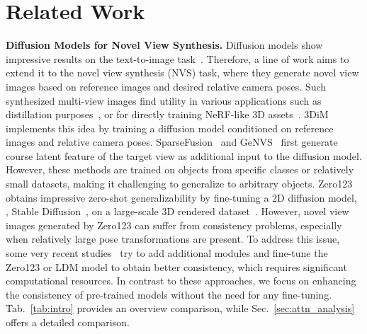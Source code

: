 \section{Related Work}
\label{sec:related_work}

\textbf{Diffusion Models for Novel View Synthesis.}
Diffusion models show impressive results on the text-to-image task~\cite{stable-diffusion, imagen, dalle2}. 
Therefore, a line of work aims to extend it to the novel view synthesis (NVS) task, where they generate novel view images based on reference images and desired relative camera poses.
Such synthesized multi-view images find utility in various applications such as distillation purposes~\cite{dreamfusion, sjc, magic3d, fantasia3d, prolificdreamer}, or for directly training NeRF-like 3D assets~\cite{nerf, neus, sparseneus}.
3DiM~\cite{3dim} implements this idea by training a diffusion model conditioned on reference images and relative camera poses.
SparseFusion~\cite{sparsefusion} and GeNVS~\cite{genvs} first generate course latent feature of the target view as additional input to the diffusion model.
However, these methods are trained on objects from specific classes or relatively small datasets, making it challenging to generalize to arbitrary objects.
Zero123~\cite{zero123} obtains impressive zero-shot generalizability by fine-tuning a 2D diffusion model, \ie, Stable Diffusion~\cite{stable-diffusion}, on a large-scale 3D rendered dataset~\cite{objaverse}.
However, novel view images generated by Zero123 can suffer from consistency problems, especially when relatively large pose transformations are present.	
To address this issue, some very recent studies~\cite{SyncDreamer, mvdream, zero123++, consistent123, ye2023consistent} try to add additional modules and fine-tune the Zero123 or LDM model to obtain better consistency, which requires significant computational resources.
In contrast to these approaches, we focus on enhancing the consistency of pre-trained models without the need for any fine-tuning. Tab.~\ref{tab:intro} provides an overview comparison, while Sec.~\ref{sec:attn_analysis} offers a detailed comparison.

